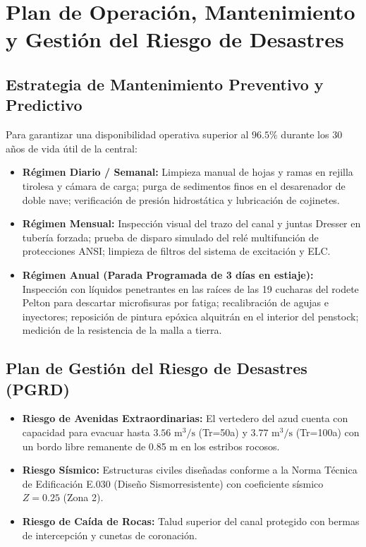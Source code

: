 \documentclass[11pt,a4paper]{report}
\begin{document}
\chapter{Plan de Operación, Mantenimiento y Gestión del Riesgo de Desastres}
\section{Estrategia de Mantenimiento Preventivo y Predictivo}
Para garantizar una disponibilidad operativa superior al $96.5\%$ durante los 30 años de vida útil de la central:
\begin{itemize}
    \item \textbf{Régimen Diario / Semanal:} Limpieza manual de hojas y ramas en rejilla tirolesa y cámara de carga; purga de sedimentos finos en el desarenador de doble nave; verificación de presión hidrostática y lubricación de cojinetes.
    \item \textbf{Régimen Mensual:} Inspección visual del trazo del canal y juntas Dresser en tubería forzada; prueba de disparo simulado del relé multifunción de protecciones ANSI; limpieza de filtros del sistema de excitación y ELC.
    \item \textbf{Régimen Anual (Parada Programada de 3 días en estiaje):} Inspección con líquidos penetrantes en las raíces de las 19 cucharas del rodete Pelton para descartar microfisuras por fatiga; recalibración de agujas e inyectores; reposición de pintura epóxica alquitrán en el interior del penstock; medición de la resistencia de la malla a tierra.
\end{itemize}

\section{Plan de Gestión del Riesgo de Desastres (PGRD)}
\begin{itemize}
    \item \textbf{Riesgo de Avenidas Extraordinarias:} El vertedero del azud cuenta con capacidad para evacuar hasta $3.56\text{ m}^3/\text{s}$ (Tr=50a) y $3.77\text{ m}^3/\text{s}$ (Tr=100a) con un bordo libre remanente de 0.85 m en los estribos rocosos.
    \item \textbf{Riesgo Sísmico:} Estructuras civiles diseñadas conforme a la Norma Técnica de Edificación E.030 (Diseño Sismorresistente) con coeficiente sísmico $Z = 0.25$ (Zona 2).
    \item \textbf{Riesgo de Caída de Rocas:} Talud superior del canal protegido con bermas de intercepción y cunetas de coronación.
\end{itemize}
\end{document}
